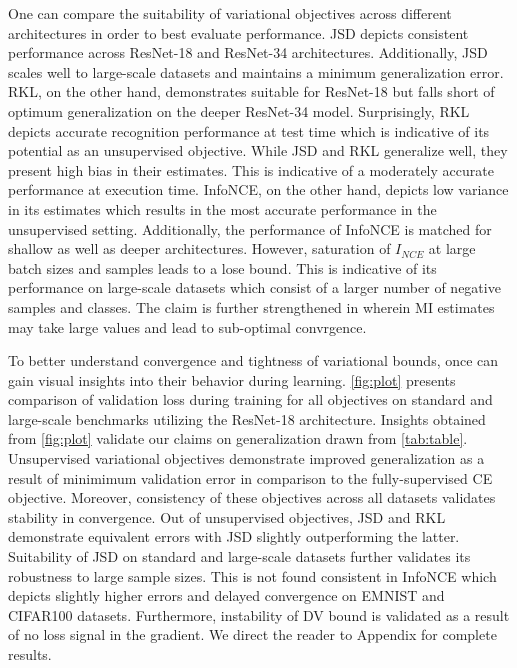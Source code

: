 \documentclass{article}
\begin{document}
One can compare the suitability of variational objectives across different architectures in order to best evaluate performance. JSD depicts consistent performance across ResNet-18 and ResNet-34 architectures. Additionally, JSD scales well to large-scale datasets and maintains a minimum generalization error. RKL, on the other hand, demonstrates suitable for ResNet-18 but falls short of optimum generalization on the deeper ResNet-34 model. Surprisingly, RKL depicts accurate recognition performance at test time which is indicative of its potential as an unsupervised objective. While JSD and RKL generalize well, they present high bias in their estimates. This is indicative of a moderately accurate performance at execution time. InfoNCE, on the other hand, depicts low variance in its estimates which results in the most accurate performance in the unsupervised setting. Additionally, the performance of InfoNCE is matched for shallow as well as deeper architectures. However, saturation of $I_{NCE}$ at large batch sizes and samples leads to a lose bound. This is indicative of its performance on large-scale datasets which consist of a larger number of negative samples and classes. The claim is further strengthened in \cite{variational} wherein MI estimates may take large values and lead to sub-optimal convrgence. 

To better understand convergence and tightness of variational bounds, once can gain visual insights into their behavior during learning. \autoref{fig:plot} presents comparison of validation loss during training for all objectives on standard and large-scale benchmarks utilizing the ResNet-18 architecture. Insights obtained from \autoref{fig:plot} validate our claims on generalization drawn from \autoref{tab:table}. Unsupervised variational objectives demonstrate improved generalization as a result of minimimum validation error in comparison to the fully-supervised CE objective. Moreover, consistency of these objectives across all datasets validates stability in convergence. Out of unsupervised objectives, JSD and RKL demonstrate equivalent errors with JSD slightly outperforming the latter. Suitability of JSD on standard and large-scale datasets further validates its robustness to large sample sizes. This is not found consistent in InfoNCE which depicts slightly higher errors and delayed convergence on EMNIST and CIFAR100 datasets. Furthermore, instability of DV bound is validated as a result of no loss signal in the gradient. We direct the reader to Appendix for complete results.  
\end{document}
